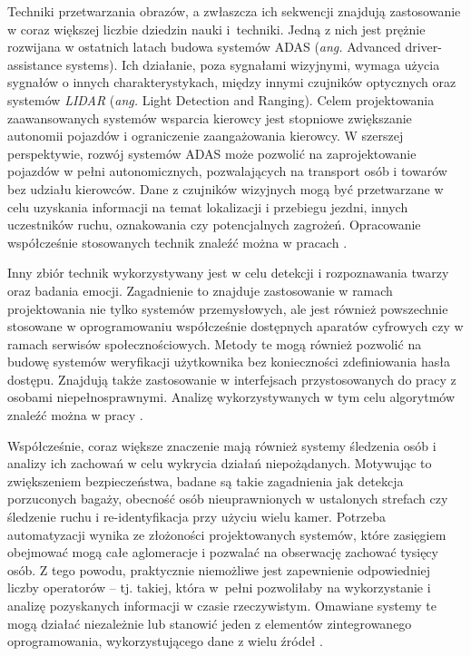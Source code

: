 Techniki przetwarzania obrazów, a zwłaszcza ich sekwencji znajdują zastosowanie w coraz większej liczbie dziedzin nauki i~techniki.
Jedną z nich jest prężnie rozwijana w ostatnich latach budowa systemów ADAS (\emph{ang.} Advanced driver-assistance systems).
Ich działanie, poza sygnałami wizyjnymi, wymaga użycia sygnałów o innych charakterystykach, między innymi czujników optycznych oraz systemów \emph{LIDAR} (\emph{ang.} Light Detection and Ranging). %
Celem projektowania zaawansowanych systemów wsparcia kierowcy jest stopniowe zwiększanie autonomii pojazdów i ograniczenie zaangażowania kierowcy. W szerszej perspektywie, rozwój systemów ADAS może pozwolić na zaprojektowanie pojazdów w pełni autonomicznych, pozwalających na transport osób i towarów bez udziału kierowców.
Dane z czujników wizyjnych mogą być przetwarzane w celu uzyskania informacji na temat lokalizacji i przebiegu jezdni, innych uczestników ruchu, oznakowania czy potencjalnych zagrożeń. 
Opracowanie współcześnie stosowanych technik znaleźć można w pracach \cite{Bengler2014,Velez2017}.

Inny zbiór technik wykorzystywany jest w celu detekcji i rozpoznawania twarzy oraz badania emocji.
Zagadnienie to znajduje zastosowanie w ramach projektowania nie tylko systemów przemysłowych, ale jest również powszechnie stosowane w oprogramowaniu współcześnie dostępnych aparatów cyfrowych czy w ramach serwisów społecznościowych. 
Metody te mogą również pozwolić na budowę systemów weryfikacji użytkownika bez konieczności zdefiniowania hasła dostępu. 
Znajdują także zastosowanie w interfejsach przystosowanych do pracy z osobami niepełnosprawnymi.
Analizę wykorzystywanych w tym celu algorytmów znaleźć można w pracy \cite{Anil2016}.

Współcześnie, coraz większe znaczenie mają również systemy śledzenia osób i analizy ich zachowań w celu wykrycia działań niepożądanych.
Motywując to zwiększeniem bezpieczeństwa, badane są takie zagadnienia jak detekcja porzuconych bagaży, obecność osób nieuprawnionych w ustalonych strefach czy śledzenie ruchu i re-identyfikacja przy użyciu wielu kamer.
Potrzeba automatyzacji wynika ze złożoności projektowanych systemów, które zasięgiem obejmować mogą całe aglomeracje i pozwalać na obserwację zachować tysięcy osób. 
Z tego powodu, praktycznie niemożliwe jest zapewnienie odpowiedniej liczby operatorów -- tj. takiej, która w~pełni pozwoliłaby na wykorzystanie i analizę pozyskanych informacji w czasie rzeczywistym. 
Omawiane systemy te mogą działać niezależnie lub stanowić jeden z elementów zintegrowanego oprogramowania, wykorzystującego dane z wielu źródeł \cite{Sriram2016,Hussain2016,Gouo2015}.


